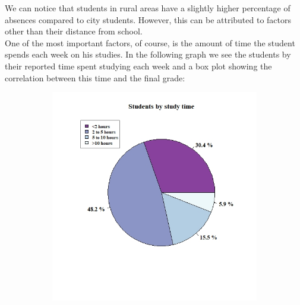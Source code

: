 \documentclass[a4paper, 11pt]{article}
\begin{document}
	We can notice that students in rural areas have a slightly higher percentage of absences compared to city students. However, this can be attributed to factors other than their distance from school.
	\\
	
	One of the most important factors, of course, is the amount of time the student spends each week on his studies. In the following graph we see the students by their reported time spent studying each week and a box plot showing the correlation between this time and the final grade:
	
	\begin{figure}[h!]
		\centering
		\begin{subfigure}[b]{0.4\linewidth}
			\hspace*{-1.2in}
			\includegraphics[width=1.5\linewidth]{study_time.jpeg}
		\end{subfigure}
		\begin{subfigure}[b]{0.4\linewidth}

\end{subfigure}
\end{figure}
\end{document}
